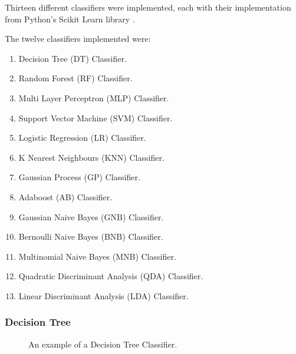Thirteen different classifiers were implemented, each with their implementation from Python's Scikit Learn library \cite{scikit-learn}.

The twelve classifiers implemented were:
\begin{enumerate}
    \item Decision Tree (DT) Classifier.
    \item Random Forest (RF) Classifier.
    \item Multi Layer Perceptron (MLP) Classifier.
    \item Support Vector Machine (SVM) Classifier.
    \item Logistic Regression (LR) Classifier.
    \item K Nearest Neighbours (KNN) Classifier.
    \item Gaussian Process (GP) Classifier.
    \item Adaboost (AB) Classifier.
    \item Gaussian Naive Bayes (GNB) Classifier.
    \item Bernoulli Naive Bayes (BNB) Classifier.
    \item Multinomial Naive Bayes (MNB) Classifier.
    \item Quadratic Discriminant Analysis (QDA) Classifier.
    \item Linear Discriminant Analysis (LDA) Classifier.
\end{enumerate}

\subsubsection*{Decision Tree}

\begin{figure}[h!]
\centering
{}
\caption{\label{fig:decisiontree} An example of a Decision Tree Classifier.}
\end{figure}


